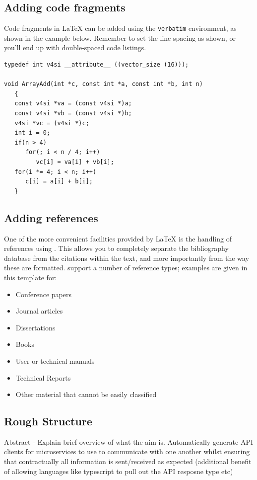 \subsection{Adding code fragments}
Code fragments in \LaTeX{} can be added using the \verb|verbatim| environment,
as shown in the example below.
Remember to set the line spacing as shown, or you'll end up with double-spaced
code listings.

\singlespaced
\begin{verbatim}
typedef int v4si __attribute__ ((vector_size (16)));

void ArrayAdd(int *c, const int *a, const int *b, int n)
   {
   const v4si *va = (const v4si *)a;
   const v4si *vb = (const v4si *)b;
   v4si *vc = (v4si *)c;
   int i = 0;
   if(n > 4)
      for(; i < n / 4; i++)
         vc[i] = va[i] + vb[i];
   for(i *= 4; i < n; i++)
      c[i] = a[i] + b[i];
   }
\end{verbatim}
\doublespaced

\subsection{Adding references}
One of the more convenient facilities provided by \LaTeX{} is the handling of
references using \BibTeX.
This allows you to completely separate the bibliography database from the
citations within the text, and more importantly from the way these are
formatted.
\BibTeX support a number of reference types; examples are given in this
template for:
\begin{itemize}
\item Conference papers \cite{bsw10icc}
\item Journal articles \cite{gamal}
\item Dissertations \cite{tunstall}
\item Books \cite{press}
\item User or technical manuals \cite{cuda-pg,netpbm}
\item Technical Reports \cite{bw1994}
\item Other material that cannot be easily classified \cite{farrell}
\end{itemize}
\subsection{Rough Structure}
Abstract - Explain brief overview of what the aim is. Automatically generate API clients for microservices to use to communicate with one another whilst ensuring that contractually all information is sent/received as expected (additional benefit of 
allowing languages like typescript to pull out the API resposne type etc)

